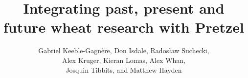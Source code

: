 \documentclass[11pt,a4paper]{article}
\title{Integrating past, present and future wheat research with Pretzel}
\author{Gabriel Keeble-Gagn\`ere,
Don Isdale,
Rados{\l}aw Suchecki,\\
Alex Kruger,
Kieran Lomas,
Alex Whan,\\
Josquin Tibbits,
and Matthew Hayden}
\begin{document}
\maketitle

\begin{abstract}
\noindent

\end{abstract}


\end{document}

